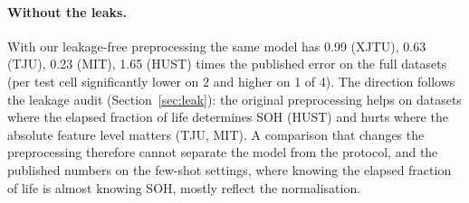 {\paragraph{Without the leaks.} With our leakage-free preprocessing the same model has 0.99 (XJTU), 0.63 (TJU), 0.23 (MIT), 1.65 (HUST) times the published error on the full datasets (per test cell significantly lower on 2 and higher on 1 of 4). The direction follows the leakage audit (Section~\ref{sec:leak}): the original preprocessing helps on datasets where the elapsed fraction of life determines SOH (HUST) and hurts where the absolute feature level matters (TJU, MIT). A comparison that changes the preprocessing therefore cannot separate the model from the protocol, and the published numbers on the few-shot settings, where knowing the elapsed fraction of life is almost knowing SOH, mostly reflect the normalisation.}
\newcommand{\BenchAbstract}{has 0.76--0.92 times the error of the re-run original code on the full datasets and 0.31--0.79 times in its few-shot settings, about as low as a GBDT with the same preprocessing}
\newcommand{\BenchDiscussion}{Three practical points follow. Reported numbers should come with per-cell errors and the exact splits, which made the comparison possible here; the logs released with PINN4SOH allowed us to reconstruct both. Released code should be the code that produced the numbers, or the differences should be listed: a constant loss term and changed weights alter the method that is being compared. And preprocessing that uses the whole life of a cell should be avoided, because its effect on the error depends on the dataset and can be large in either direction.}
